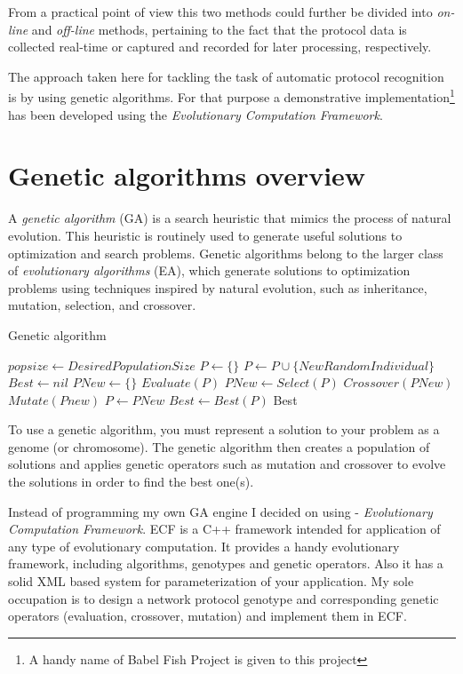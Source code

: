 \documentclass[times, utf8, diplomski]{fer}
\begin{document}
From a practical point of view this two methods could further be divided into 
\emph{on-line} and \emph{off-line} methods, pertaining to the fact that the protocol
data is collected real-time or captured and recorded for later processing, respectively.

The approach taken here for tackling the task of automatic protocol recognition
is by using genetic algorithms. For that purpose a demonstrative implementation\footnote{
A handy name of Babel Fish Project is given to this project}
has been developed using the \emph{Evolutionary Computation Framework}.

\section{Genetic algorithms overview}
A \emph{genetic algorithm} (GA) is a search heuristic that mimics the process of 
natural evolution. This heuristic is routinely used to generate useful solutions 
to optimization and search problems. Genetic algorithms belong to the larger class 
of \emph{evolutionary algorithms} (EA), which generate solutions to optimization 
problems using techniques inspired by natural evolution, such as inheritance, 
mutation, selection, and crossover.

\begin{algorithm}
\caption{Genetic algorithm}
\label{alg:gen_alg}
\begin{algorithmic}
\STATE $popsize \gets DesiredPopulationSize$
\STATE $P \gets \{\}$
	\STATE $P \gets P \cup \{NewRandomIndividual\}$
\ENDFOR
\STATE $Best \gets nil$
\REPEAT
	\STATE $PNew \gets \{\}$
	\STATE $Evaluate(P)$
	\STATE $PNew \gets Select(P)$
	\STATE $Crossover(PNew)$
	\STATE $Mutate(Pnew)$
	\STATE $P \gets PNew$
	\STATE $Best \gets Best(P)$
\RETURN Best
\end{algorithmic}
\end{algorithm}

To use a genetic algorithm, you must represent a solution to your problem as a 
genome (or chromosome). The genetic algorithm then creates a population of 
solutions and applies genetic operators such as mutation and crossover to 
evolve the solutions in order to find the best one(s).

Instead of programming my own GA engine I decided on using - \emph{Evolutionary 
Computation Framework}.
ECF is a C++ framework intended for application of any type of evolutionary 
computation. It provides a handy evolutionary framework, including algorithms,
genotypes and genetic operators. Also it has a solid XML based system for 
parameterization of your application. My sole occupation is to design a network
protocol genotype and corresponding genetic operators (evaluation, crossover,
mutation) and implement them in ECF.
\end{document}
